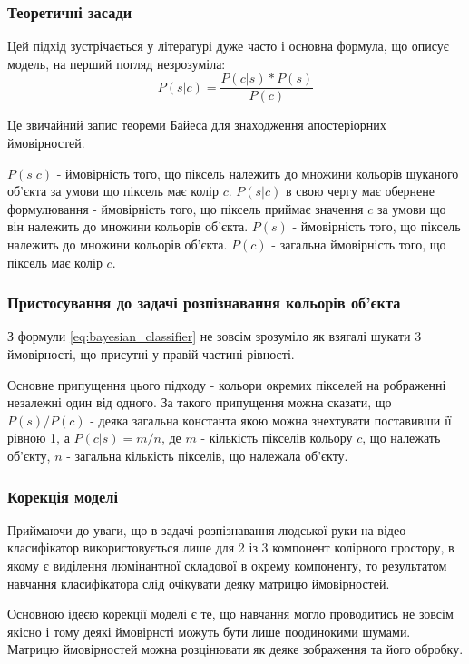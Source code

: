 \subsubsection{Теоретичні засади}

Цей підхід зустрічається у літературі дуже часто і основна формула, що описує модель, на перший погляд незрозуміла:
\begin{equation}
\label{eq:bayesian_classifier}
P(s|c) = \frac{P(c|s) * P(s)}{P(c)}
\end{equation}

Це звичайний запис теореми Байеса для знаходження апостеріорних ймовірностей.

$P(s|c)$ - ймовірність того, що піксель належить до множини кольорів шуканого об'єкта за умови що піксель має колір $c$. $P(s|c)$ в свою чергу має обернене формулювання - ймовірність того, що піксель приймає значення $c$ за умови що він належить до множини кольорів об'єкта.
$P(s)$ - ймовірність того, що піксель належить до множини кольорів об'єкта. $P(c)$ - загальна ймовірність того, що піксель має колір $c$.

\subsubsection{Пристосування до задачі розпізнавання кольорів об'єкта}

З формули \ref{eq:bayesian_classifier} не зовсім зрозуміло як взягалі шукати 3 ймовірності, що присутні у правій частині рівності.

Основне припущення цього підходу - кольори окремих пікселей на рображенні незалежні один від одного. За такого припущення можна сказати, що $P(s)/P(c)$ - деяка загальна константа якою можна знехтувати поставивши її рівною 1, а $P(c|s) = m/n$, де $m$ - кількість пікселів кольору $c$, що належать об'єкту, $n$ - загальна кількість пікселів, що належала об'єкту.

\subsubsection{Корекція моделі}
Приймаючи до уваги, що в задачі розпізнавання людської руки на відео класифікатор використовується лише для 2 із 3 компонент колірного простору, в якому є виділення люмінантної складової в окрему компоненту, то результатом навчання класифікатора слід очікувати деяку матрицю ймовірностей.

Основною ідеєю корекції моделі є те, що навчання могло проводитись не зовсім якісно і тому деякі ймовірнсті можуть бути лише поодинокими шумами. Матрицю ймовірностей можна розцінювати як деяке зображення та його обробку.

